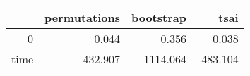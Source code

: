 \begin{table}[ht]
\centering
\begingroup\tiny
\begin{tabular}{rrrr}
  \hline
 & permutations & bootstrap & tsai \\ 
  \hline
0 & 0.044 & 0.356 & 0.038 \\ 
  time & -432.907 & 1114.064 & -483.104 \\ 
   \hline
\end{tabular}
\endgroup
\end{table}
